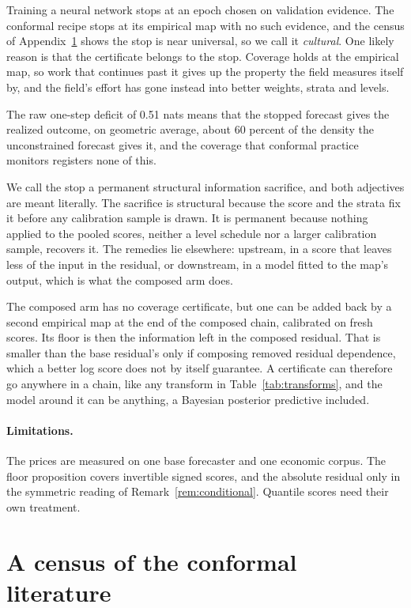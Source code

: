 \documentclass[11pt]{article}
\theoremstyle{remark}
\begin{document}
Training a neural network stops at an epoch chosen on validation evidence. The
conformal recipe stops at its empirical map with no such evidence, and the census of
Appendix~\ref{sec:count} shows the stop is near universal, so we call it \emph{cultural}. One likely reason is
that the certificate belongs to the stop. Coverage holds at the empirical map, so
work that continues past it gives up the property the field measures itself by, and
the field's effort has gone instead into better weights, strata and levels.

The raw one-step deficit of 0.51 nats means that the stopped forecast gives the
realized outcome, on geometric average, about 60 percent of the density the
unconstrained forecast gives it, and the coverage that conformal practice monitors registers none of this.

We call the stop a permanent structural information sacrifice, and both adjectives
are meant literally. The sacrifice is structural because the score and the strata fix
it before any calibration sample is drawn. It is permanent because nothing applied to
the pooled scores, neither a level schedule nor a larger calibration sample, recovers
it. The remedies lie elsewhere: upstream, in a score that leaves less of the input in
the residual, or downstream, in a model fitted to the map's output, which is what the
composed arm does.

The composed arm has no coverage certificate, but one can be added back by a second
empirical map at the end of the composed chain, calibrated on fresh scores. Its floor is
then the information left in the composed residual. That is smaller than the base
residual's only if composing removed residual dependence, which a better log score does
not by itself guarantee. A certificate can therefore go anywhere in a chain, like any
transform in Table~\ref{tab:transforms}, and the model around it can be anything, a
Bayesian posterior predictive included.

\paragraph{Limitations.} The prices are measured on one base
forecaster and one economic corpus. The floor proposition covers invertible signed
scores, and the absolute residual only in the symmetric reading of
Remark~\ref{rem:conditional}. Quantile scores need their own treatment.

\appendix

\section{A census of the conformal literature}\label{sec:count}
\end{document}
